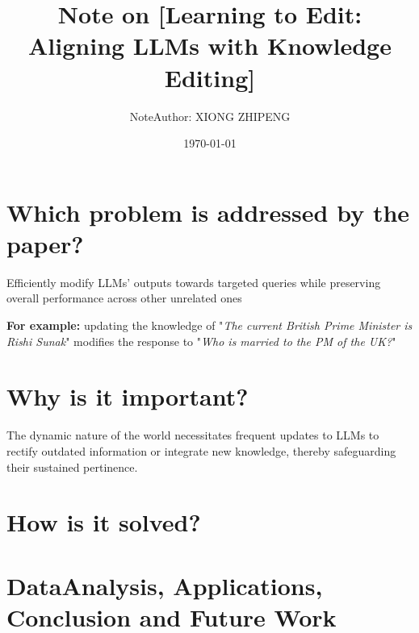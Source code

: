 \documentclass{article}
\title{Note on [Learning to Edit: Aligning LLMs with Knowledge Editing]}
\author{NoteAuthor: XIONG ZHIPENG}
\date{\today}
\begin{document}
\maketitle

\section{Which problem is addressed by the paper?}
Efficiently modify LLMs' outputs towards targeted queries while preserving overall performance across other unrelated ones

\textbf{For example:}
updating the knowledge of "\textit{The current British Prime Minister is Rishi Sunak}" 
modifies the response to "\textit{Who is married to the PM of the UK?}" 


\section{Why is it important?}

The dynamic nature of the world  necessitates frequent updates to LLMs to rectify outdated information 
or integrate new knowledge, thereby safeguarding their sustained pertinence.


\section{How is it solved?}

\section{DataAnalysis, Applications, Conclusion and Future Work}
\end{document}
